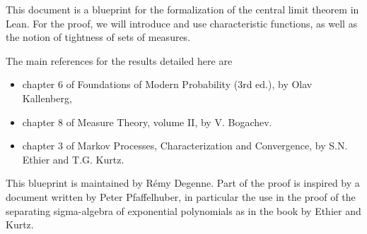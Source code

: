 
This document is a blueprint for the formalization of the central limit theorem in Lean.
For the proof, we will introduce and use characteristic functions, as well as the notion of tightness of sets of measures.

The main references for the results detailed here are
\begin{itemize}
	\item chapter 6 of Foundations of Modern Probability (3rd ed.), by Olav Kallenberg,
	\item chapter 8 of Measure Theory, volume II, by V. Bogachev.
	\item chapter 3 of Markov Processes, Characterization and Convergence, by S.N. Ethier and T.G. Kurtz.
\end{itemize}

This blueprint is maintained by R\'emy Degenne. Part of the proof is inspired by a document written by Peter Pfaffelhuber, in particular the use in the proof of the separating sigma-algebra of exponential polynomials as in the book by Ethier and Kurtz.






